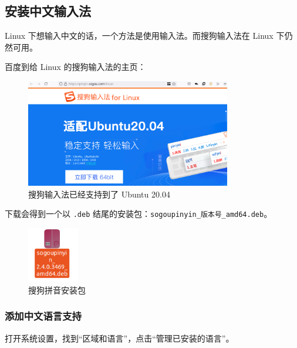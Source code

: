 \documentclass[UTF-8]{ctexart}
\begin{document}
		\subsection{安装中文输入法}
		
			Linux 下想输入中文的话，一个方法是使用输入法。而搜狗输入法在 Linux 下仍然可用。
			
			百度到给 Linux 的搜狗输入法的主页：
		
			\begin{figure}[H]
				\centering
				\includegraphics[width=0.8\textwidth]{fig/sogou.png}
				\caption*{搜狗输入法已经支持到了 Ubuntu 20.04}
			\end{figure}
	
			下载会得到一个以 \texttt{.deb} 结尾的安装包：\texttt{sogoupinyin\_版本号\_amd64.deb}。
			
			\begin{figure}[H]
				\centering
				\includegraphics[width=0.2\textwidth]{fig/sogoupinyin_deb.png}
				\caption*{搜狗拼音安装包}
			\end{figure}
			
			\subsubsection{添加中文语言支持}
			
				打开系统设置，找到“区域和语言”，点击“管理已安装的语言”。
				
\end{document}
